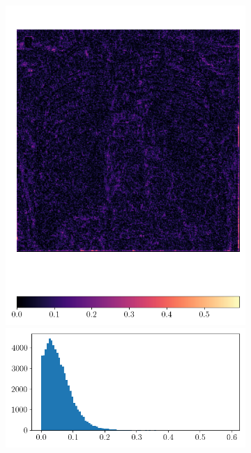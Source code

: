\documentclass[12pt]{article}
\begin{document}
\newpage



\begin{figure}[ht]
  \centering
  \begin{subfigure}{0.48\textwidth}
  \includegraphics[width=1\linewidth]{images//chest_xray/ex_2/lambda_map.png}
  \includegraphics[width=1\linewidth]{images//chest_xray/ex_2/lambda_map_values_histogram.png}\

\end{subfigure}
\end{figure}
\end{document}

